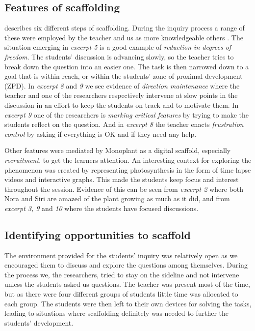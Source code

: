 \subsection{Features of scaffolding}
\citet{wood1976role} describes six different steps of scaffolding. During the inquiry process a range of these were employed by the teacher and us as more knowledgeable others \citep{vygotskiui1978mind}. The situation emerging in \emph{excerpt 5} is a good example of \emph{reduction in degrees of freedom}. The students' discussion is advancing slowly, so the teacher tries to break down the question into an easier one. The task is then narrowed down to a goal that is within reach, or within the students' zone of proximal development (ZPD). In \emph{excerpt 8} and \emph{9} we see evidence of \emph{direction maintenance} where the teacher and one of the researchers respectively intervene at slow points in the discussion in an effort to keep the students on track and to motivate them. In \emph{excerpt 9} one of the researchers is \emph{marking critical features} by trying to make the students reflect on the question. And in \emph{excerpt 8} the teacher enacts \emph{frustration control} by asking if everything is OK and if they need any help. 

Other features were mediated by Monoplant as a digital scaffold, especially \emph{recruitment}, to get the learners attention. An interesting context for exploring the phenomenon was created by representing photosynthesis in the form of time lapse videos and interactive graphs. This made the students keep focus and interest throughout the session. Evidence of this can be seen from \emph{excerpt 2} where both Nora and Siri are amazed of the plant growing as much as it did, and from \emph{excerpt 3, 9} and \emph{10} where the students have focused discussions. 


\subsection{Identifying opportunities to scaffold}
The environment provided for the students' inquiry was relatively open as we encouraged them to discuss and explore the questions among themselves. During the process we, the researchers, tried to stay on the sideline and not intervene unless the students asked us questions. The teacher was present most of the time, but as there were four different groups of students little time was allocated to each group. The students were then left to their own devices for solving the tasks, leading to situations where scaffolding definitely was needed to further the students' development. 

